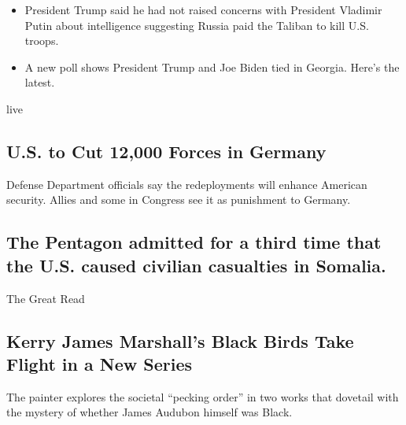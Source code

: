 \begin{itemize}
\tightlist
\item
  President Trump said he had not raised concerns with President
  Vladimir Putin about intelligence suggesting Russia paid the Taliban
  to kill U.S. troops.
\item
  A new poll shows President Trump and Joe Biden tied in Georgia. Here's
  the latest.
\end{itemize}

live

\href{/2020/07/29/world/europe/us-troops-nato-germany.html}{}

\hypertarget{us-to-cut-12000-forces-in-germany}{%
\subsection{U.S. to Cut 12,000 Forces in
Germany}\label{us-to-cut-12000-forces-in-germany}}

Defense Department officials say the redeployments will enhance American
security. Allies and some in Congress see it as punishment to Germany.

\href{/2020/07/28/world/africa/pentagon-somalia-civilian-casualties.html}{}

\hypertarget{the-pentagon-admitted-for-a-third-time-that-the-us-caused-civilian-casualties-in-somalia}{%
\subsection{The Pentagon admitted for a third time that the U.S. caused
civilian casualties in
Somalia.}\label{the-pentagon-admitted-for-a-third-time-that-the-us-caused-civilian-casualties-in-somalia}}

\href{/2020/07/29/arts/design/kerry-james-marshall-audubon.html}{}

The Great Read

\hypertarget{kerry-james-marshalls-black-birds-take-flight-in-a-new-series}{%
\subsection{Kerry James Marshall's Black Birds Take Flight in a New
Series}\label{kerry-james-marshalls-black-birds-take-flight-in-a-new-series}}

The painter explores the societal ``pecking order'' in two works that
dovetail with the mystery of whether James Audubon himself was Black.

\href{/2020/07/29/arts/design/kerry-james-marshall-audubon.html}{}

